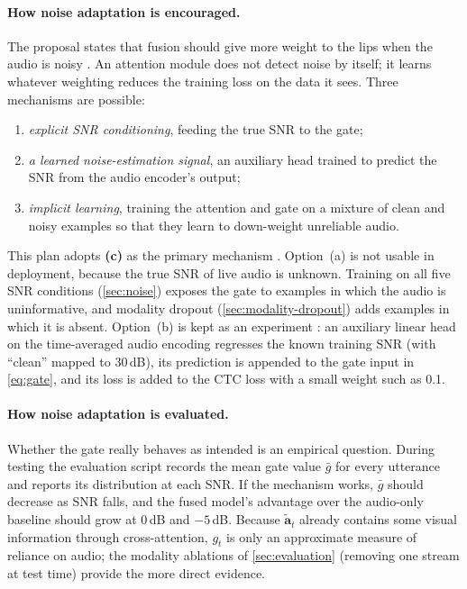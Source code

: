 \paragraph{How noise adaptation is encouraged.} The proposal states that fusion
should give more weight to the lips when the audio is noisy \spec. An attention
module does not detect noise by itself; it learns whatever weighting reduces
the training loss on the data it sees. Three mechanisms are possible:
\begin{enumerate}[label=(\alph*)]
  \item \emph{explicit SNR conditioning}, feeding the true SNR to the gate;
  \item \emph{a learned noise-estimation signal}, an auxiliary head trained to
        predict the SNR from the audio encoder's output;
  \item \emph{implicit learning}, training the attention and gate on a mixture
        of clean and noisy examples so that they learn to down-weight
        unreliable audio.
\end{enumerate}
This plan adopts \textbf{(c)} as the primary mechanism \rec. Option~(a) is not
usable in deployment, because the true SNR of live audio is unknown. Training on
all five SNR conditions (\cref{sec:noise}) exposes the gate to examples in which
the audio is uninformative, and modality dropout (\cref{sec:modality-dropout})
adds examples in which it is absent. Option~(b) is kept as an experiment
\tbd: an auxiliary linear head on the time-averaged audio encoding regresses the
known training SNR (with ``clean'' mapped to 30\,dB), its prediction is appended
to the gate input in \cref{eq:gate}, and its loss is added to the CTC loss with a
small weight such as 0.1.

\paragraph{How noise adaptation is evaluated.} Whether the gate really behaves
as intended is an empirical question. During testing the evaluation script
records the mean gate value $\bar{g}$ for every utterance and reports its
distribution at each SNR. If the mechanism works, $\bar{g}$ should decrease as
SNR falls, and the fused model's advantage over the audio-only baseline should
grow at 0\,dB and $-5$\,dB. Because $\tilde{\mathbf{a}}_t$ already contains some visual
information through cross-attention, $g_t$ is only an approximate measure of
reliance on audio; the modality ablations of \cref{sec:evaluation}
(removing one stream at test time) provide the more direct evidence.

